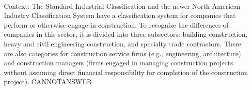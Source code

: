 \documentclass[11pt,a4paper, onecolumn]{article}
\begin{document}
\\ Context: The Standard Industrial Classification and the newer North American Industry Classification System have a classification system for companies that perform or otherwise engage in construction. To recognize the differences of companies in this sector, it is divided into three subsectors: building construction, heavy and civil engineering construction, and specialty trade contractors. There are also categories for construction service firms (e.g., engineering, architecture) and construction managers (firms engaged in managing construction projects without assuming direct financial responsibility for completion of the construction project). CANNOTANSWER
\end{document}
